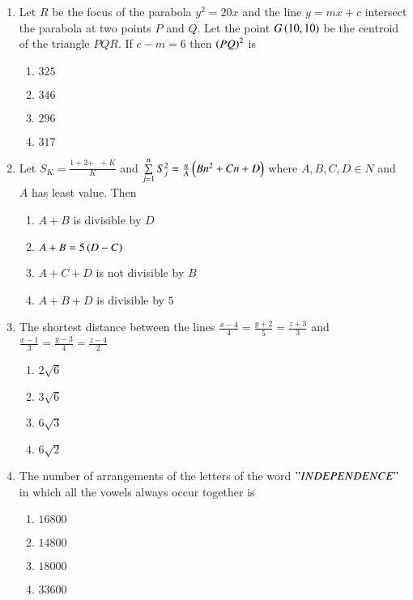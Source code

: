 \documentclass[journal]{IEEEtran}
\begin{document}
\begin{enumerate}
{}
\item{
Let $R$ be the focus of the parabola $y^2=20x$ and the line $y=mx+c$ intersect the parabola at two points $P$ and $Q$. Let the point $G\left(10,10\right)$ be the centroid of the triangle $PQR$. If $c-m=6$ then $\left(PQ\right)^2$ is
\begin{multicols}{4}
\begin{enumerate}
\item $325$
\item $346$
\item $296$
\item $317$
\end{enumerate}
\end{multicols}
}
\item{
Let $S_K=\frac{1+2+_{...}+K}{K}$ and $\sum\limits_{j=1}^n S_j^2=\frac{n}{A}\left(Bn^2+Cn+D\right)$ where $A,B,C,D\in N$ and $A$ has least value. Then
\begin{multicols}{2}
\begin{enumerate}
\item $A+B$ is divisible by $D$
\item $A+B=5\left(D-C\right)$
\item $A+C+D$ is not divisible by $B$
\item $A+B+D$ is divisible by $5$
\end{enumerate}
\end{multicols}
}
\item{
The shortest distance between the lines $\frac{x-4}{4}=\frac{y+2}{5}=\frac{z+3}{3}$ and $\frac{x-1}{3}=\frac{y-3}{4}=\frac{z-4}{2}$
\begin{multicols}{4}
\begin{enumerate}
\item $2\sqrt{6}$
\item $3\sqrt{6}$
\item $6\sqrt{3}$
\item $6\sqrt{2}$
\end{enumerate}
\end{multicols}
}
\item{
The number of arrangements of the letters of the word $"INDEPENDENCE"$ in which all the vowels always occur together is
\begin{multicols}{4}
\begin{enumerate}
\item $16800$
\item $14800$
\item $18000$
\item $33600$
\end{enumerate}

\end{multicols}}
\end{enumerate}
\end{document}
